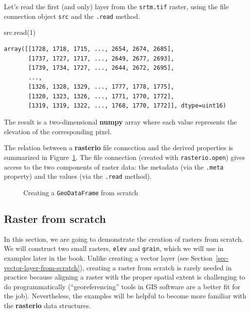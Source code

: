\documentclass[
  letterpaper,
]{krantz}
\newenvironment{Shaded}{\begin{snugshade}}{\end{snugshade}}
\newcommand{\DecValTok}[1]{\textcolor[rgb]{0.68,0.00,0.00}{#1}}
\newcommand{\NormalTok}[1]{\textcolor[rgb]{0.00,0.23,0.31}{#1}}
\begin{document}
Let's read the first (and only) layer from the \texttt{srtm.tif} raster,
using the file connection object \texttt{src} and the \texttt{.read}
method.

\begin{Shaded}
\begin{Highlighting}[]
\NormalTok{src.read(}\DecValTok{1}\NormalTok{)}
\end{Highlighting}
\end{Shaded}

\begin{verbatim}
array([[1728, 1718, 1715, ..., 2654, 2674, 2685],
       [1737, 1727, 1717, ..., 2649, 2677, 2693],
       [1739, 1734, 1727, ..., 2644, 2672, 2695],
       ...,
       [1326, 1328, 1329, ..., 1777, 1778, 1775],
       [1320, 1323, 1326, ..., 1771, 1770, 1772],
       [1319, 1319, 1322, ..., 1768, 1770, 1772]], dtype=uint16)
\end{verbatim}

The result is a two-dimensional \textbf{numpy} array where each value
represents the elevation of the corresponding pixel.

The relation between a \textbf{rasterio} file connection and the derived
properties is summarized in Figure~\ref{fig-rasterio-structure}. The
file connection (created with \texttt{rasterio.open}) gives access to
the two components of raster data: the metadata (via the \texttt{.meta}
property) and the values (via the \texttt{.read} method).

\begin{figure}


\caption{\label{fig-rasterio-structure}Creating a \texttt{GeoDataFrame}
from scratch}

\end{figure}%

\subsection{Raster from scratch}\label{sec-raster-from-scratch}

In this section, we are going to demonstrate the creation of rasters
from scratch. We will construct two small rasters, \texttt{elev} and
\texttt{grain}, which we will use in examples later in the book. Unlike
creating a vector layer (see
Section~\ref{sec-vector-layer-from-scratch}), creating a raster from
scratch is rarely needed in practice because aligning a raster with the
proper spatial extent is challenging to do programmatically
(``georeferencing'' tools in GIS software are a better fit for the job).
Nevertheless, the examples will be helpful to become more familiar with
the \textbf{rasterio} data structures.
\end{document}
